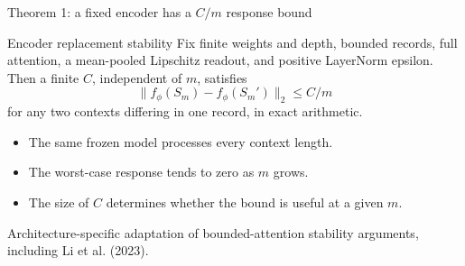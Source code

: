 \documentclass[aspectratio=169,11pt]{beamer}
\newcommand{\norm}[1]{\lVert #1\rVert_2}
\newcommand{\source}[1]{\par\vfill{\color{muted}\tiny #1}}
\begin{document}
\begin{frame}{Theorem 1: a fixed encoder has a \(C/m\) response bound}
\begin{block}{Encoder replacement stability}
Fix finite weights and depth, bounded records, full attention,
a mean-pooled Lipschitz readout, and positive LayerNorm epsilon.
Then a finite \(C\), independent of \(m\), satisfies
\[
\boxed{\norm{f_\phi(S_m)-f_\phi(S_m')}\le C/m}
\]
for any two contexts differing in one record, in exact arithmetic.
\end{block}
\vspace{3mm}
\begin{itemize}
\setlength{\itemsep}{2mm}
\item The same frozen model processes every context length.
\item The worst-case response tends to zero as \(m\) grows.
\item The size of \(C\) determines whether the bound is useful at a given \(m\).
\end{itemize}
\source{Architecture-specific adaptation of bounded-attention stability
arguments, including Li et al. (2023).}
\end{frame}
\end{document}
